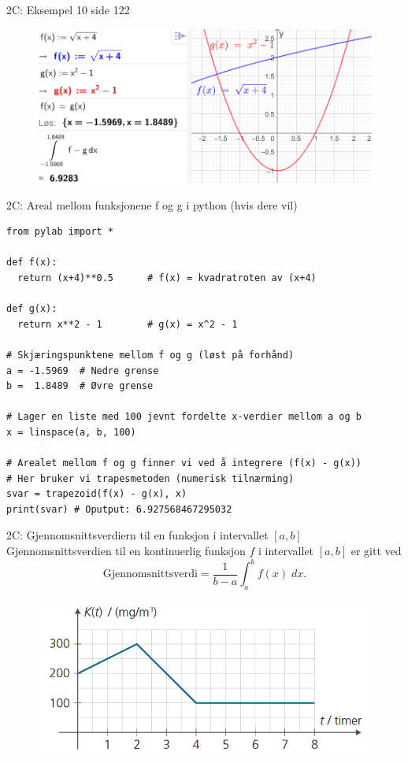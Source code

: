 \greenheader\begin{frame}{2C: Eksempel 10 side 122}
\begin{figure}
    \centering
    \includegraphics[width=\linewidth]{R2-K2C-7.png}
\end{figure}
\end{frame}

\greenheader
\begin{frame}[fragile]{2C: Areal mellom funksjonene f og g i python (hvis dere vil)}
\begin{verbatim}
from pylab import *

def f(x):
  return (x+4)**0.5      # f(x) = kvadratroten av (x+4)

def g(x):
  return x**2 - 1        # g(x) = x^2 - 1

# Skjæringspunktene mellom f og g (løst på forhånd)
a = -1.5969  # Nedre grense
b =  1.8489  # Øvre grense

# Lager en liste med 100 jevnt fordelte x-verdier mellom a og b
x = linspace(a, b, 100)

# Arealet mellom f og g finner vi ved å integrere (f(x) - g(x))
# Her bruker vi trapesmetoden (numerisk tilnærming)
svar = trapezoid(f(x) - g(x), x)
print(svar) # Oputput: 6.927568467295032
\end{verbatim}
\end{frame}


\redheader
\begin{frame}{2C: Gjennomsnittsverdiern til en funksjon i intervallet $[a, b]$}
Gjennomsnittsverdien til en kontinuerlig funksjon \(f\) i intervallet \([a,b]\) er gitt ved
\[\text{Gjennomsnittsverdi} = \frac{1}{b-a}\int_a^b f(x) \; dx.\]
\begin{figure}
    \centering
    \includegraphics[width=0.6\linewidth]{R2-K2B-13.png}
\end{figure}    
\end{frame}

